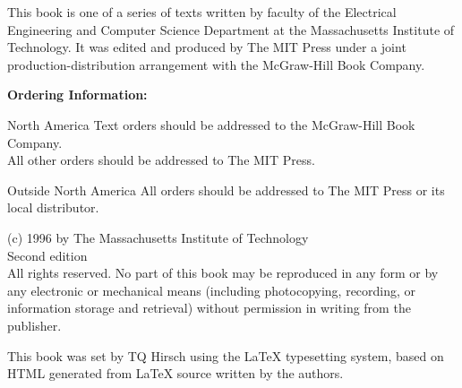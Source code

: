 \frontmatter
This book is one of a series of texts written by faculty of the
Electrical Engineering and Computer Science Department at the
Massachusetts Institute of Technology.  It was edited and produced by
The MIT Press under a joint production-distribution arrangement with
the McGraw-Hill Book Company.

\textbf{Ordering Information:}
\begin{description}
\item{North America}
  Text orders should be addressed to the McGraw-Hill Book Company.\\
  All other orders should be addressed to The MIT Press.
\item{Outside North America}
  All orders should be addressed to The MIT Press or its local distributor.
\end{description}

(c) 1996 by The Massachusetts Institute of Technology\\
Second edition\\

All rights reserved.  No part of this book may be reproduced in any
form or by any electronic or mechanical means (including photocopying,
recording, or information storage and retrieval) without permission in
writing from the publisher.

This book was set by TQ Hirsch using the \LaTeX{} typesetting system,
based on HTML generated from \LaTeX{} source written by the authors.



